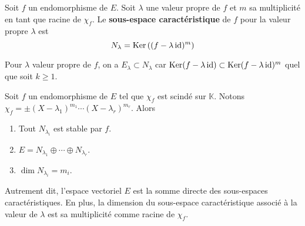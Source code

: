     \begin{defi}{}{}
        Soit $f$ un endomorphisme de $E$. Soit $\lambda$ une valeur propre de $f$ et $m$ sa multiplicité en tant que racine de $\chi_f$. Le \textbf{sous-espace caractéristique} de $f$ pour la valeur propre $\lambda$ est 
        \[ N_{\lambda} = \operatorname{Ker}\left((f - \lambda \operatorname{id})^m\right) \]     
    \end{defi}

    Pour $\lambda$ valeur propre de $f$, on a $E_{\lambda} \subset N_{\lambda}$ car $\operatorname{Ker}(f - \lambda \operatorname{id}) \subset \operatorname{Ker}(f - \lambda \operatorname{id})^m$ quel que soit $k \geq 1$.

    \begin{theo}{}{}
        Soit $f$ un endomorphisme de $E$ tel que $\chi_f$ est scindé sur $\mathbb{K}$. Notons $\chi_f = \pm (X - \lambda_1)^{m_1} \cdots (X - \lambda_r)^{m_r}$. Alors 
        \begin{enumerate}
            \item Tout $N_{\lambda_i}$ est stable par $f$.
            \item $E = N_{\lambda_1} \oplus \cdots \oplus N_{\lambda_r}$.
            \item $\dim N_{\lambda_i} = m_i$.
        \end{enumerate}
    \end{theo}

    Autrement dit, l’espace vectoriel $E$ est la somme directe des sous-espaces caractéristiques. En plus, la dimension du sous-espace caractéristique associé à la valeur de $\lambda$ est sa multiplicité comme racine de $\chi_f$.

